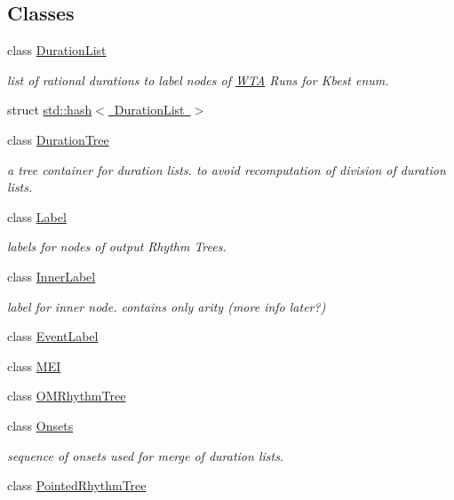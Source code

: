 \subsection*{Classes}
\begin{DoxyCompactItemize}
\item 
class \mbox{\hyperlink{classDurationList}{Duration\+List}}
\begin{DoxyCompactList}\small\item\em list of rational durations to label nodes of \mbox{\hyperlink{classWTA}{W\+TA}} Runs for Kbest enum. \end{DoxyCompactList}\item 
struct \mbox{\hyperlink{structstd_1_1hash_3_01DurationList_01_4}{std\+::hash$<$ Duration\+List $>$}}
\item 
class \mbox{\hyperlink{classDurationTree}{Duration\+Tree}}
\begin{DoxyCompactList}\small\item\em a tree container for duration lists. to avoid recomputation of division of duration lists. \end{DoxyCompactList}\item 
class \mbox{\hyperlink{classLabel}{Label}}
\begin{DoxyCompactList}\small\item\em labels for nodes of output Rhythm Trees. \end{DoxyCompactList}\item 
class \mbox{\hyperlink{classInnerLabel}{Inner\+Label}}
\begin{DoxyCompactList}\small\item\em label for inner node. contains only arity (more info later?) \end{DoxyCompactList}\item 
class \mbox{\hyperlink{classEventLabel}{Event\+Label}}
\item 
class \mbox{\hyperlink{classMEI}{M\+EI}}
\item 
class \mbox{\hyperlink{classOMRhythmTree}{O\+M\+Rhythm\+Tree}}
\item 
class \mbox{\hyperlink{classOnsets}{Onsets}}
\begin{DoxyCompactList}\small\item\em sequence of onsets used for merge of duration lists. \end{DoxyCompactList}\item 
class \mbox{\hyperlink{classPointedRhythmTree}{Pointed\+Rhythm\+Tree}}
\item 

\end{DoxyCompactItemize}
